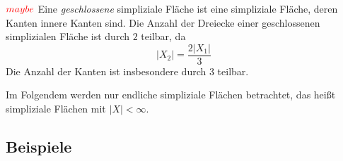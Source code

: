 \documentclass[12pt,titlepage]{article}
\begin{document}
\begin{bemerkung} $\textcolor{red}{maybe}$ Eine \emph{geschlossene} simpliziale Fläche ist eine simpliziale Fläche, deren Kanten innere Kanten sind. Die Anzahl der Dreiecke einer geschlossenen simplizialen Fläche ist durch $2$ teilbar, da
\[
\vert X_{2} \vert = \frac{2\vert X_{1}\vert}{3}
\]
Die Anzahl der Kanten ist insbesondere durch 3 teilbar.\\
\end{bemerkung}
Im Folgendem werden nur endliche simpliziale Flächen betrachtet, das heißt simpliziale Flächen mit $\vert X \vert < \infty$.\\

 \subsection*{Beispiele}
\end{document}
